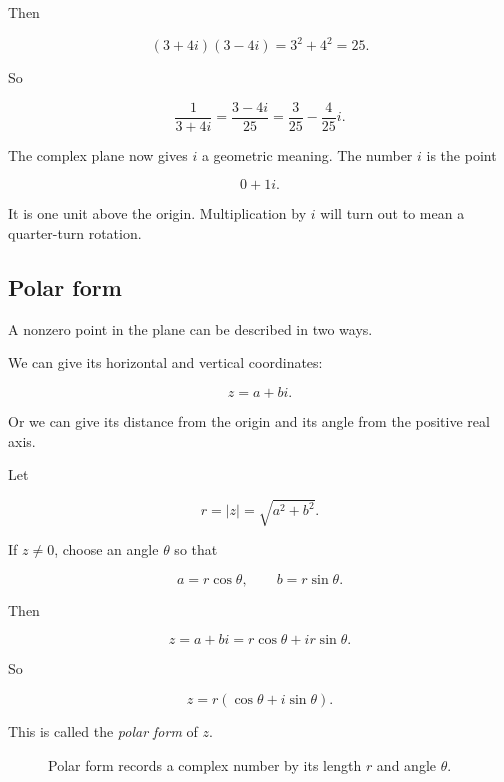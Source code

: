 Then

\[
(3+4i)(3-4i)=3^2+4^2=25.
\]

So

\[
\boxed{
\frac{1}{3+4i}=\frac{3-4i}{25}
=
\frac{3}{25}-\frac{4}{25}i.
}
\]

The complex plane now gives \(i\) a geometric meaning.  The number \(i\) is the point

\[
0+1i.
\]

It is one unit above the origin.  Multiplication by \(i\) will turn out to mean a
quarter-turn rotation.

\subsection{Polar form}
\label{subsec:complex-polar-form}

A nonzero point in the plane can be described in two ways.

We can give its horizontal and vertical coordinates:

\[
z=a+bi.
\]

Or we can give its distance from the origin and its angle from the positive real axis.

Let

\[
r=|z|=\sqrt{a^2+b^2}.
\]

If \(z\neq0\), choose an angle \(\theta\) so that

\[
a=r\cos\theta,
\qquad
b=r\sin\theta.
\]

Then

\[
z=a+bi
=
r\cos\theta+i r\sin\theta.
\]

So

\[
\boxed{
z=r(\cos\theta+i\sin\theta).
}
\]

This is called the \emph{polar form} of \(z\).

\begin{figure}[h]
\centering
{}
\caption{Polar form records a complex number by its length \(r\) and angle \(\theta\).}
\label{fig:complex-polar-form}
\end{figure}

